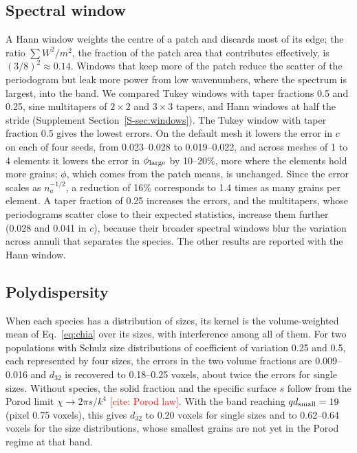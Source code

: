 \documentclass[11pt]{article}
\newcommand{\todo}[1]{\textcolor{red}{[#1]}}
\begin{document}
\subsection{Spectral window}\label{sec:window}

A Hann window weights the centre of a patch and discards most of its edge;
the ratio $\sum W^2/m^2$, the fraction of the patch area that contributes
effectively, is $(3/8)^2\approx0.14$. Windows that keep more of the patch
reduce the scatter of the periodogram but leak more power from low
wavenumbers, where the spectrum is largest, into the band. We compared
Tukey windows with taper fractions 0.5 and 0.25, sine multitapers of
$2\times2$ and $3\times3$ tapers, and Hann windows at half the stride
(Supplement Section~\ref{S-sec:windows}). The Tukey window with taper
fraction 0.5 gives the lowest errors. On the default mesh it lowers the
error in $c$ on each of four seeds, from 0.023--0.028 to 0.019--0.022, and
across meshes of 1 to 4 elements it lowers the error in
$\phi_{\rm large}$ by 10--20\%, more where the elements hold more grains;
$\phi$, which comes from the patch means, is unchanged. Since the error
scales as $n_a^{-1/2}$, a reduction of 16\% corresponds to 1.4 times as many
grains per element. A taper fraction of 0.25 increases the errors, and the
multitapers, whose periodograms scatter close to their expected statistics,
increase them further (0.028 and 0.041 in $c$), because their broader
spectral windows blur the variation across annuli that separates the
species. The other results are reported with the Hann window.

\subsection{Polydispersity}

When each species has a distribution of sizes, its kernel is the
volume-weighted mean of Eq.~\eqref{eq:chia} over its sizes, with
interference among all of them. For two populations with Schulz size
distributions of coefficient of variation 0.25 and 0.5, each represented by
four sizes, the errors in the two volume fractions are 0.009--0.016 and
$d_{32}$ is recovered to 0.18--0.25 voxels, about twice the errors for single
sizes. Without species, the solid fraction and the specific surface $s$
follow from the Porod limit $\chi\to2\pi s/k^4$ \todo{cite: Porod law}. With
the band reaching $qd_{\rm small}=19$ (pixel 0.75 voxels), this gives $d_{32}$
to 0.20 voxels for single sizes and to 0.62--0.64 voxels for the size
distributions, whose smallest grains are not yet in the Porod regime at
that band.
\end{document}
